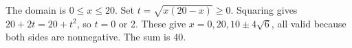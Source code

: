 The domain is $0\le x\le20$. Set $t=\sqrt{x(20-x)}\ge0$. Squaring gives $20+2t=20+t^2$, so $t=0$ or 2. These give $x=0,20,10\pm4\sqrt6$, all valid because both sides are nonnegative. The sum is $\boxed{40}$.
